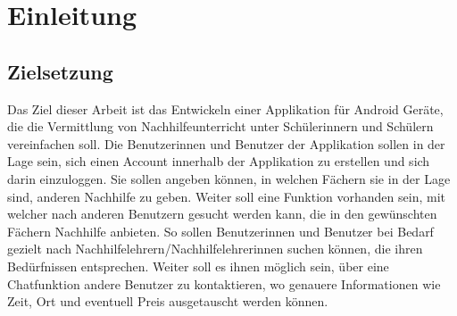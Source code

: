 \documentclass[../main.tex]{subfiles}
\begin{document}
\chapter{Einleitung}
\section{Zielsetzung}
Das Ziel dieser Arbeit ist das Entwickeln einer Applikation für Android Geräte, die die Vermittlung von Nachhilfeunterricht unter Schülerinnern und Schülern vereinfachen soll. Die Benutzerinnen und Benutzer der Applikation sollen in der Lage sein, sich einen Account innerhalb der Applikation zu erstellen und sich darin einzuloggen. Sie sollen angeben können, in welchen Fächern sie in der Lage sind, anderen Nachhilfe zu geben. Weiter soll eine Funktion vorhanden sein, mit welcher nach anderen Benutzern gesucht werden kann, die in den gewünschten Fächern Nachhilfe anbieten. So sollen Benutzerinnen und Benutzer bei Bedarf gezielt nach Nachhilfelehrern/Nachhilfelehrerinnen suchen können, die ihren Bedürfnissen entsprechen. Weiter soll es ihnen möglich sein, über eine Chatfunktion andere Benutzer zu kontaktieren, wo genauere Informationen wie Zeit, Ort und eventuell Preis ausgetauscht werden können.
\end{document}
